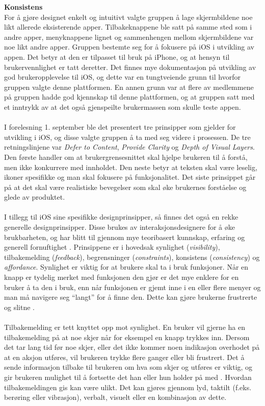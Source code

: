 \noindent\textbf{Konsistens}\\
For å gjøre designet enkelt og intuitivt valgte gruppen å lage skjermbildene noe likt allerede eksisterende apper. Tilbakeknappene ble satt på samme sted som i andre apper, menyknappene lignet og sammenhengen mellom skjermbildene var noe likt andre apper. Gruppen bestemte seg for å fokusere på iOS i utvikling av appen. Det betyr at den er tilpasset til bruk på iPhone, og at hensyn til brukervennlighet er tatt deretter. Det finnes mye dokumentasjon på utvikling av god brukeropplevelse til iOS, og dette var en tungtveiende grunn til hvorfor gruppen valgte denne plattformen. En annen grunn var at flere av medlemmene på gruppen hadde god kjennskap til denne plattformen, og at gruppen satt med et inntrykk av at det også gjenspeilte brukermassen som skulle teste appen.
\\\\
I forelesning 1. september ble det presentert tre prinsipper som gjelder for utvikling i iOS, og disse valgte gruppen å ta med seg videre i prosessen. De tre retningslinjene var \textit{Defer to Content}, \textit{Provide Clarity} og \textit{Depth of Visual Layers}\cite{guidelines}. Den første handler om at brukergrensesnittet skal hjelpe brukeren til å forstå, men ikke konkurrere med innholdet. Den neste betyr at teksten skal være leselig, ikoner spesifikke og man skal fokusere på funksjonalitet. Det siste prinsippet går på at det skal være realistiske bevegelser som skal øke brukernes forståelse og glede av produktet. 
\\\\
I tillegg til iOS sine spesifikke designprinsipper, så finnes det også en rekke generelle designprinsipper. Disse brukes av interaksjonsdesignere for å øke brukbarheten, og har blitt til gjennom mye teoribasert kunnskap, erfaring og generell fornuftighet \cite[p.~26]{preece}. Prinsippene er i hovedsak synlighet (\textit{visibility}), tilbakemelding (\textit{feedback}), begrensninger (\textit{constraints}), konsistens (\textit{consistency}) og \textit{affordance}. Synlighet er viktig for at brukere skal ta i bruk funksjoner. Når en knapp er tydelig merket med funksjonen den gjør er det mye enklere for en bruker å ta den i bruk, enn når funksjonen er gjemt inne i en eller flere menyer og man må navigere seg “langt” for å finne den. Dette kan gjøre brukerne frustrerte og slitne \cite[p.~26]{preece}.
\\\\
Tilbakemelding er tett knyttet opp mot synlighet. En bruker vil gjerne ha en tilbakemelding på at noe skjer når for eksempel en knapp trykkes inn. Dersom det tar lang tid før noe skjer, eller det ikke kommer noen indikasjon overhodet på at en aksjon utføres, vil brukeren trykke flere ganger eller bli frustrert. Det å sende informasjon tilbake til brukeren om hva som skjer og utføres er viktig, og gir brukeren mulighet til å fortsette det han eller hun holder på med \cite[p.~26]{preece}. Hvordan tilbakemeldingen gis kan være ulikt. Det kan gjøres gjennom lyd, taktilt (f.eks. berøring eller vibrasjon), verbalt, visuelt eller en kombinasjon av dette.
